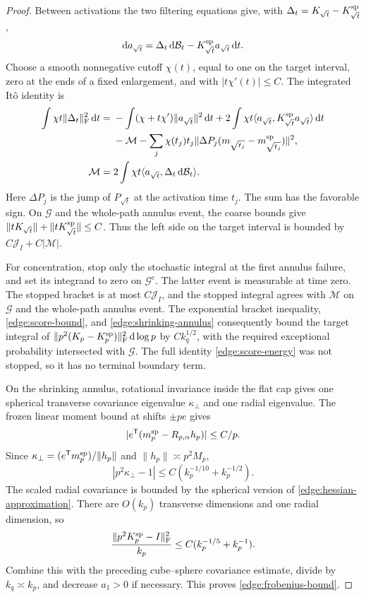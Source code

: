 \begin{proof}
Between activations the two filtering equations give, with
\(\Delta_t=K_{\sqrt t}-K_{\sqrt t}^{\rm sp}\),
\[
 \mathrm da_{\sqrt t}
       =\Delta_t\,\mathrm d\mathcal B_t
          -K_{\sqrt t}^{\rm sp}a_{\sqrt t}\,\mathrm dt .
\]
Choose a smooth nonnegative cutoff \(\chi(t)\), equal to one on the
target interval, zero at the ends of a fixed enlargement, and with
\(|t\chi'(t)|\le C\).  The integrated Itô identity is
\begin{equation}\label{edge:score-energy}
 \begin{split}
 \int\chi t\|\Delta_t\|_{\rm F}^2\,\mathrm dt
 ={}&-\int(\chi+t\chi')\|a_{\sqrt t}\|^2\,\mathrm dt
       +2\int\chi t\langle a_{\sqrt t},
                         K_{\sqrt t}^{\rm sp}a_{\sqrt t}\rangle\,\mathrm dt\\
 &-\mathcal M
   -\sum_j\chi(t_j)t_j
       \|\Delta P_j(m_{\sqrt{t_j}}-m_{\sqrt{t_j}}^{\rm sp})\|^2,\\
 \mathcal M={}&2\int\chi t
       \langle a_{\sqrt t},\Delta_t\,\mathrm d\mathcal B_t\rangle .
 \end{split}
\end{equation}
Here \(\Delta P_j\) is the jump of \(P_{\sqrt t}\) at the activation
time \(t_j\).
The sum has the favorable sign.  On \(\mathcal G\) and the whole-path
annulus event, the coarse bounds give
\(\|tK_{\sqrt t}\|+\|tK_{\sqrt t}^{\rm sp}\|\le C\).
Thus the left side on the target interval is bounded by
\(C\mathcal J_I+C|\mathcal M|\).

For concentration, stop only the stochastic integral at the first
annulus failure, and set its integrand to zero on \(\mathcal G^c\).
The latter event is measurable at time zero.  The stopped bracket is
at most \(C\mathcal J_I\), and the stopped integral agrees with \(\mathcal M\)
on \(\mathcal G\) and the whole-path annulus event.  The exponential
bracket inequality, \eqref{edge:score-bound}, and
\eqref{edge:shrinking-annulus} consequently bound the target integral
of \(\|p^2(K_p-K_p^{\rm sp})\|_{\rm F}^2\,\mathrm d\log p\) by
\(Ck_q^{1/2}\), with the required exceptional probability intersected
with \(\mathcal G\).  The full identity \eqref{edge:score-energy} was
not stopped, so it has no terminal boundary term.

On the shrinking annulus, rotational invariance inside the flat cap
gives one spherical transverse covariance eigenvalue
\(\kappa_\perp\) and one radial eigenvalue.  The frozen linear moment
bound at shifts \(\pm pe\) gives
\[
 |e^{\mathsf T}(m_p^{\rm sp}-R_{p,\alpha}h_p)|\le C/p.
\]
Since \(\kappa_\perp=(e^{\mathsf T}m_p^{\rm sp})/\|h_p\|\) and
\(\|h_p\|\asymp p^2M_p\),
\[
 |p^2\kappa_\perp-1|
       \le C(k_p^{-1/10}+k_p^{-1/2}).
\]
The scaled radial covariance is bounded by the spherical version of
\eqref{edge:hessian-approximation}.  There are \(O(k_p)\) transverse
dimensions and one radial dimension, so
\[
 \frac{\|p^2K_p^{\rm sp}-I\|_{\rm F}^2}{k_p}
       \le C(k_p^{-1/5}+k_p^{-1}).
\]
Combine this with the preceding cube--sphere covariance estimate,
divide by \(k_q\asymp k_p\), and decrease \(a_1>0\) if necessary.
This proves \eqref{edge:frobenius-bound}.
\end{proof}


